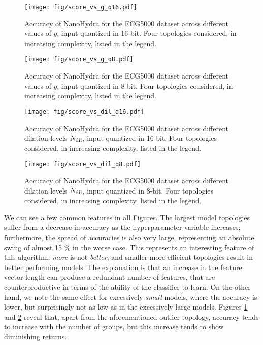 \begin{figure}[h!]
    \centerfloat
    \texttt{[image: fig/score\_vs\_g\_q16.pdf]}
    \caption{Accuracy of NanoHydra for the ECG5000 dataset across different values of $g$, input quantized in 16-bit. Four topologies considered, in increasing complexity, listed in the legend.}
    \label{fig:vs_g_q16}
\end{figure}
\begin{figure}[h!]
    \centerfloat
    \texttt{[image: fig/score\_vs\_g\_q8.pdf]}
    \caption{Accuracy of NanoHydra for the ECG5000 dataset across different values of $g$, input quantized in 8-bit. Four topologies considered, in increasing complexity, listed in the legend.}
    \label{fig:vs_g_q8}
\end{figure}
\begin{figure}[h!]
    \centerfloat
    \texttt{[image: fig/score\_vs\_dil\_q16.pdf]}
    \caption{Accuracy of NanoHydra for the ECG5000 dataset across different dilation levels $N\sb{\text{dil}}$, input quantized in 16-bit. Four topologies considered, in increasing complexity, listed in the legend.}
    \label{fig:vs_dil_q16}
\end{figure}
\begin{figure}[h!]
    \centerfloat
    \texttt{[image: fig/score\_vs\_dil\_q8.pdf]}
    \caption{Accuracy of NanoHydra for the ECG5000 dataset across different dilation levels $N\sb{\text{dil}}$, input quantized in 8-bit. Four topologies considered, in increasing complexity, listed in the legend.}
    \label{fig:vs_dil_q8}
\end{figure}
We can see a few common features in all Figures. The largest model topologies suffer from a decrease in accuracy as the hyperparameter variable increases; furthermore, the spread of accuracies is also very large, representing an absolute swing of almost 15 \% in the worse case.
This represents an interesting feature of this algorithm: \emph{more} is not \emph{better}, and smaller more efficient topologies result in better performing models. 
The explanation is that an increase in the feature vector length can produce a redundant number of features, that are counterproductive in terms of the ability of the classifier to learn.
On the other hand, we note the same effect for excessively \emph{small} models, where the accuracy is lower, but surprisingly not as low as in the excessively large models.
Figures \ref{fig:vs_g_q16} and \ref{fig:vs_g_q8} reveal that, apart from the aforementioned outlier topology, accuracy tends to increase with the number of groups, but this increase tends to show diminishing returns.
